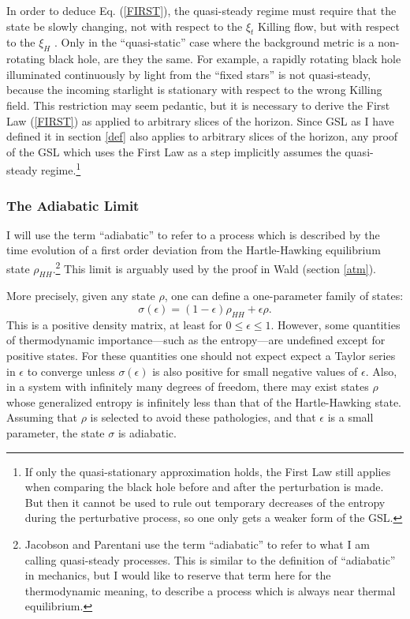 \documentclass[12pt]{article}
\begin{document}
In order to deduce Eq. (\ref{FIRST}), the quasi-steady regime must require that the state be slowly changing, not with respect to the $\xi_t$ Killing flow, but with respect to the $\xi_H$ \cite{JP03}.  Only in the ``quasi-static'' case where the background metric is a non-rotating black hole, are they the same.  For example, a rapidly rotating black hole illuminated continuously by light from the ``fixed stars'' is not quasi-steady, because the incoming starlight is stationary with respect to the wrong Killing field.  This restriction may seem pedantic, but it is necessary to derive the First Law (\ref{FIRST}) as applied to arbitrary slices of the horizon.  Since GSL as I have defined it in section \ref{def} also applies to arbitrary slices of the horizon, any proof of the GSL which uses the First Law as a step implicitly assumes the quasi-steady regime.\footnote{If only the quasi-stationary approximation holds, the First Law still applies when comparing the black hole before and after the perturbation is made.  But then it cannot be used to rule out temporary decreases of the entropy during the perturbative process, so one only gets a weaker form of the GSL.}

\subsubsection{The Adiabatic Limit}\label{adiabatic}

I will use the term ``adiabatic'' to refer to a process which is described by the time 
evolution of a first order deviation from the Hartle-Hawking equilibrium state $\rho_{HH}$.\footnote{Jacobson and Parentani \cite{JP03} use the term ``adiabatic'' to refer to what I am calling quasi-steady processes.  This is similar to the definition of ``adiabatic'' in mechanics, but I would like to reserve that term here for the thermodynamic meaning, to describe a process which is always near thermal equilibrium.}  This limit is arguably used by the proof in Wald \cite{wald94} (section \ref{atm}).

More precisely, given any state $\rho$, one can define a one-parameter family of states:
\begin{equation}
\sigma(\epsilon) = (1 - \epsilon) \rho_{HH} + \epsilon \rho.
\end{equation}
This is a positive density matrix, at least for $0 \le \epsilon \le 1$.  However, some quantities of thermodynamic importance---such as the entropy---are undefined except for positive states.  For these quantities one should not expect expect a Taylor series in $\epsilon$ to converge unless $\sigma(\epsilon)$ is also positive for small negative values of $\epsilon$.  Also, in a system with infinitely many degrees of freedom, there may exist states $\rho$ whose generalized entropy is infinitely less than that of the Hartle-Hawking state.  Assuming that $\rho$ is selected to avoid these pathologies, and that $\epsilon$ is a small parameter, the state $\sigma$ is adiabatic.
\end{document}

